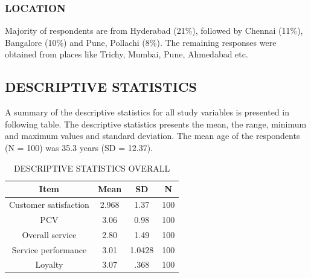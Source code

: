 \documentclass[a4paper, 12pt]{extarticle}
\begin{document}
{\subsubsection{LOCATION}
Majority of respondents are from Hyderabad (21\%), followed by Chennai (11\%), Bangalore (10\%) and Pune, Pollachi (8\%). The remaining responses were obtained from places like  Trichy, Mumbai, Pune, Ahmedabad etc.

\subsection{DESCRIPTIVE STATISTICS}
A summary of the descriptive statistics for all study variables is presented in following table. The descriptive statistics presents the mean, the range, minimum and maximum values and standard deviation. The mean age of the respondents (N = 100) was 35.3 years (SD = 12.37). 

\begin{table}[H]
\centering
\begin{tabular}{|c|c|c|c|}
\hline
Item & \textbf{Mean} & \textbf{SD} & N \\
\hline
Customer satisfaction & 2.968 & 1.37 & 100 \\
\hline
PCV & 3.06 & 0.98 & 100 \\
\hline
Overall service & 2.80 & 1.49 & 100 \\
\hline
Service performance & 3.01 & 1.0428 & 100 \\
\hline
Loyalty & 3.07 & .368 & 100 \\
\hline
\end{tabular}
\caption{DESCRIPTIVE STATISTICS OVERALL}
\end{table} 

}
\end{document}
